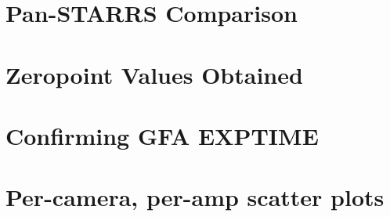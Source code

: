 \documentclass{article}
\begin{document}
\section{Pan-STARRS Comparison}

\section{Zeropoint Values Obtained}



\appendix

\section{Confirming GFA EXPTIME}

\section{Per-camera, per-amp scatter plots}
\end{document}

